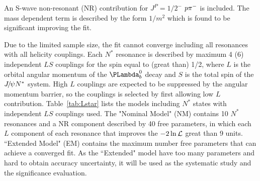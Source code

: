 An S-wave non-resonant (NR) contribution for $J^P=1/2^-$  $p{{\pi}^-}$ is included. 
The mass dependent term is described by the form $1/m^2$ which is found to be significant improving the fit.

Due to the limited sample size, 
the fit cannot converge including all resonances with all helicity couplings. 
Each $N^*$ resonance is described by maximum 4 (6) independent $LS$ couplings for the spin equal to (great than) 1/2, 
where $L$ is the orbital angular momentum of the $\Lb$ decay and $S$ is the total spin of the ${{J\mskip -3mu/\mskip -2mu\psi}} N^*$ system. 
High $L$ couplings are expected to be suppressed by the angular momentum barrier, 
so the couplings is selected by first allowing low $L$ contribution. 
Table~\ref{tab:Lstar} lists the models including $N^*$ states with independent $LS$ couplings used. 
The "Nominal Model" (NM) contains 10 $N^*$ resonances and a NR component described by 40 free parameters, 
in which each $L$ component of each resonance that improves the $-2\ln{\cal L}$ great than 9 units. 
``Extended Model" (EM) contains the maximum number free parameters that can achieve a converged fit.  
As the ``Extended" model have too many parameters and hard to obtain accuracy uncertainty, 
it will be used as the systematic study and the significance evaluation.

